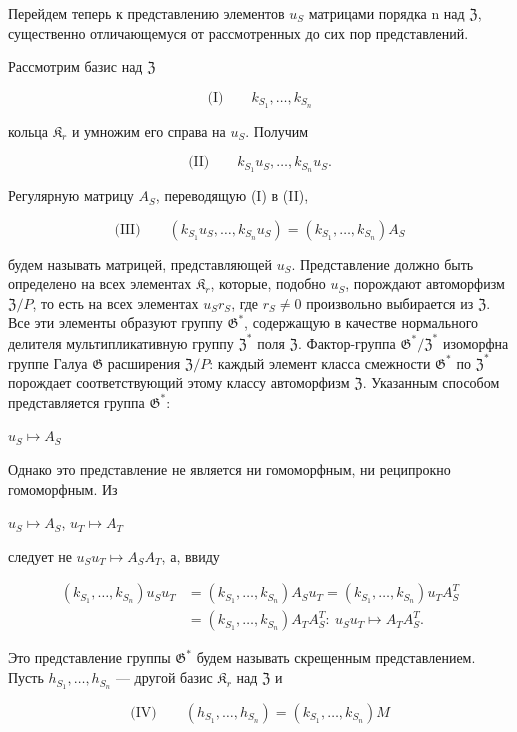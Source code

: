 \documentclass[11pt]{article}
\begin{document}
Перейдем теперь к представлению элементов \(u_S\) матрицами порядка n над \(\mathfrak{Z}\), существенно отличающемуся от рассмотренных до сих пор представлений.

Рассмотрим базис над \(\mathfrak Z\)

\[
\text{(I)}\qquad k_{S_1}, \ldots, k_{S_n}
\]

кольца \(\mathfrak K_r\) и умножим его справа на \(u_S\). Получим

\[
\text{(II)}\qquad k_{S_1}u_S, \ldots, k_{S_n}u_S.
\]

Регулярную матрицу \(A_S\), переводящую (I) в (II),

\[
\text{(III)}\qquad (k_{S_1}u_S, \ldots, k_{S_n}u_S) = (k_{S_1}, \ldots, k_{S_n})A_S
\]

будем называть матрицей, представляющей \(u_S\). Представление должно быть определено на всех элементах \(\mathfrak K_{r}\), которые, подобно \(u_S\), порождают автоморфизм \(\mathfrak Z/P\), то есть на всех элементах \(u_Sr_S\), где \(r_S \neq 0\) произвольно выбирается из \(\mathfrak Z\). Все эти элементы образуют группу \(\mathfrak G^*\), содержащую в качестве нормального делителя мультипликативную группу \(\mathfrak Z^*\) поля \(\mathfrak Z\). Фактор-группа \(\mathfrak G^*/\mathfrak Z^*\) изоморфна группе Галуа \(\mathfrak G\) расширения \(\mathfrak Z/P\): каждый элемент класса смежности \(\mathfrak G^*\) по \(\mathfrak Z^*\) порождает соответствующий этому классу автоморфизм \(\mathfrak Z\). Указанным способом представляется группа \(\mathfrak G^*\):

\(u_S \mapsto A_S\)

Однако это представление не является ни гомоморфным, ни реципрокно гомоморфным. Из

\(u_S \mapsto A_S\), \(u_T \mapsto A_T\)

следует не \(u_Su_T \mapsto A_SA_T\), а, ввиду

\[
\begin{aligned}
(k_{S_1}, \ldots, k_{S_n})u_Su_T
&=(k_{S_1}, \ldots, k_{S_n})A_Su_T
=(k_{S_1}, \ldots, k_{S_n})u_TA_S^T\\
&=(k_{S_1}, \ldots, k_{S_n})A_TA_S^T:\ u_Su_T\mapsto A_TA_S^T.
\end{aligned}
\]

Это представление группы \(\mathfrak{G}^*\) будем называть скрещенным представлением. Пусть \(h_{S_1}, \ldots, h_{S_n}\) --- другой базис \(\mathfrak{K}_r\) над \(\mathfrak{Z}\) и

\[
\text{(IV)}\qquad (h_{S_1}, \ldots, h_{S_n}) = (k_{S_1}, \ldots, k_{S_n})M
\]
\end{document}
